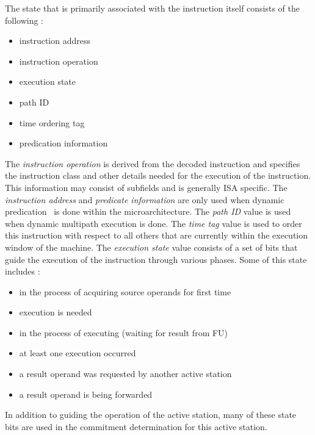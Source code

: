 \documentclass{book}
\begin{document}
The state that is primarily associated with the instruction itself
consists of the following :
%
\begin{itemize}
\vspace{-0.10in}
\item{instruction address}
\vspace{-0.10in}
\item{instruction operation}
\vspace{-0.10in}
\item{execution state}
\vspace{-0.10in}
\item{path ID}
\vspace{-0.10in}
\item{time ordering tag}
\vspace{-0.10in}
\item{predication information}
\vspace{-0.10in}
\end{itemize}   
%
The \textit{instruction operation} is derived from the decoded
instruction and specifies the instruction class and other
details needed for the execution of the instruction.
This information may consist of subfields and is generally ISA
specific.
The \textit{instruction address} and \textit{predicate information}
are only used when dynamic predication~\cite{morano02predication}
is done within the microarchitecture.
The \textit{path ID} value is used when dynamic multipath
execution is done.
The \textit{time tag} value is used to order this instruction
with respect to all others that are currently within the execution
window of the machine.
The \textit{execution state} value consists of a set of
bits that guide the execution of the instruction through
various phases.  
Some of this state includes :
%
\begin{itemize}
\vspace{-0.10in}
\item{in the process of acquiring source operands for first time}
\vspace{-0.10in}
\item{execution is needed}
\vspace{-0.10in}
\item{in the process of executing (waiting for result from FU)}
\vspace{-0.10in}
\item{at least one execution occurred}
\vspace{-0.10in}
\item{a result operand was requested by another active station}
\vspace{-0.10in}
\item{a result operand is being forwarded}
\vspace{-0.10in}
\end{itemize}   
%
In addition to guiding the operation of the active station,
many of these state bits are used in the commitment determination
for this active station.
\end{document}
